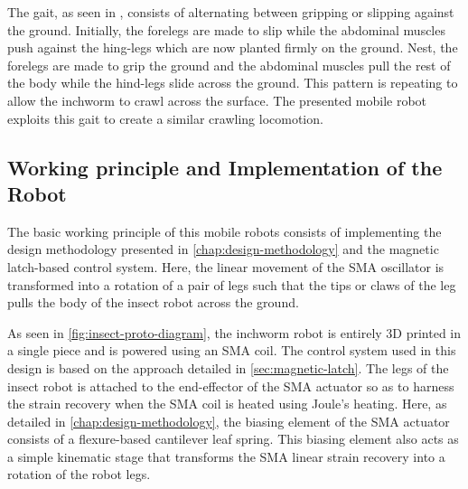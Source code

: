 The gait, as seen in \todocite, consists of alternating between gripping or slipping against the ground. Initially, the forelegs are made to slip while the abdominal muscles push against the hing-legs which are now planted firmly on the ground. Nest, the forelegs are made to grip the ground and the abdominal muscles pull the rest of the body while the hind-legs slide across the ground. This pattern is repeating to allow the inchworm to crawl across the surface. The presented mobile robot exploits this gait to create a similar crawling locomotion.

\subsection{Working principle and Implementation of the Robot}

The basic working principle of this mobile robots consists of implementing the design methodology presented in \cref{chap:design-methodology} and the magnetic latch-based control system. Here, the linear movement of the SMA oscillator is transformed into a rotation of a pair of legs such that the tips or claws of the leg pulls the body of the insect robot across the ground.

As seen in \cref{fig:insect-proto-diagram}, the inchworm robot is entirely 3D printed in a single piece and is powered using an SMA coil. The control system used in this design is based on the approach detailed in \cref{sec:magnetic-latch}. The legs of the insect robot is attached to the end-effector of the SMA actuator so as to harness the strain recovery when the SMA coil is heated using Joule's heating. Here, as detailed in \cref{chap:design-methodology}, the biasing element of the SMA actuator consists of a flexure-based cantilever leaf spring. This biasing element also acts as a simple kinematic stage that transforms the SMA linear strain recovery into a rotation of the robot legs.

